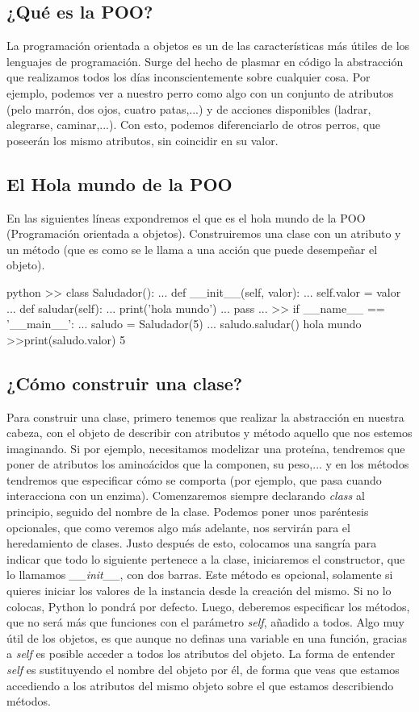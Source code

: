 \documentclass{article}
\begin{document}
\subsection{¿Qué es la POO?}
La programación orientada a objetos es un de las características más útiles de los lenguajes de programación. Surge del hecho de plasmar en código la abstracción que realizamos todos los días inconscientemente sobre cualquier cosa. Por ejemplo, podemos ver a nuestro perro como algo con un conjunto de atributos (pelo marrón, dos ojos, cuatro patas,...) y de acciones disponibles (ladrar, alegrarse, caminar,...). Con esto, podemos diferenciarlo de otros perros, que poseerán los mismo atributos, sin coincidir en su valor.
\subsection{El Hola mundo de la POO}
En las siguientes líneas expondremos el que es el hola mundo de la POO (Programación orientada a objetos). Construiremos una clase con un atributo y un método (que es como se le llama a una acción que puede desempeñar el objeto).
\newpage
\begin{mintedbox}{python}
>> class Saludador():
...     def __init__(self, valor):
...         self.valor = valor
...     def saludar(self):
...         print('hola mundo')
...         pass
...
>> if __name__ == '__main__':
...     saludo = Saludador(5)
...     saludo.saludar()
hola mundo
>>print(saludo.valor)
5
\end{mintedbox}

\subsection{¿Cómo construir una clase?}
Para construir una clase, primero tenemos que realizar la abstracción en nuestra cabeza, con el objeto de describir con atributos y método aquello que nos estemos imaginando. Si por ejemplo, necesitamos modelizar una proteína, tendremos que poner de atributos los aminoácidos que la componen, su peso,... y en los métodos tendremos que especificar cómo se comporta (por ejemplo, que pasa cuando interacciona con un enzima). Comenzaremos siempre declarando \textit{class} al principio, seguido del nombre de la clase. Podemos poner unos paréntesis opcionales, que como veremos algo más adelante, nos servirán para el heredamiento de clases. Justo después de esto, colocamos una sangría para indicar que todo lo siguiente pertenece a la clase, iniciaremos el constructor, que lo llamamos \textit{\_\_init\_\_}, con dos barras. Este método es opcional, solamente si quieres iniciar los valores de la instancia desde la creación del mismo. Si no lo colocas, Python lo pondrá por defecto. Luego, deberemos especificar los métodos, que no será más que funciones con el parámetro \textit{self}, añadido a todos. Algo muy útil de los objetos, es que aunque no definas una variable en una función, gracias a \textit{self} es posible acceder a todos los atributos del objeto. La forma de entender \textit{self} es sustituyendo el nombre del objeto por él, de forma que veas que estamos accediendo a los atributos del mismo objeto sobre el que estamos describiendo métodos.
\end{document}
